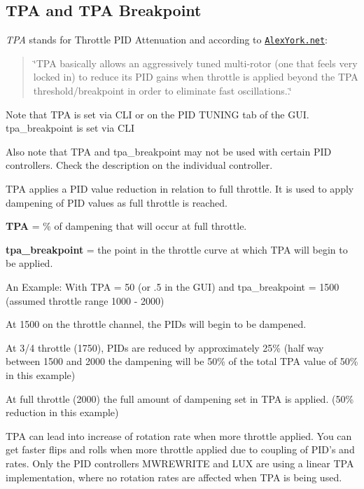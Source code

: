 \subsection*{T\+P\+A and T\+P\+A Breakpoint}

{\itshape T\+P\+A} stands for Throttle P\+I\+D Attenuation and according to \href{http://blog.alexyorke.net/what-is-tpa/}{\tt Alex\+York.\+net}\+:

\begin{quote}
\char`\"{}\+T\+P\+A basically allows an aggressively tuned multi-\/rotor (one that feels very locked in) to reduce its P\+I\+D gains when throttle is applied beyond the T\+P\+A threshold/breakpoint in order to eliminate fast oscillations..\char`\"{} \end{quote}


Note that T\+P\+A is set via C\+L\+I or on the P\+I\+D T\+U\+N\+I\+N\+G tab of the G\+U\+I. {\ttfamily tpa\+\_\+breakpoint} is set via C\+L\+I

Also note that T\+P\+A and {\ttfamily tpa\+\_\+breakpoint} may not be used with certain P\+I\+D controllers. Check the description on the individual controller.

T\+P\+A applies a P\+I\+D value reduction in relation to full throttle. It is used to apply dampening of P\+I\+D values as full throttle is reached.

{\bfseries T\+P\+A} = \% of dampening that will occur at full throttle.

{\bfseries tpa\+\_\+breakpoint} = the point in the throttle curve at which T\+P\+A will begin to be applied.

An Example\+: With T\+P\+A = 50 (or .5 in the G\+U\+I) and {\ttfamily tpa\+\_\+breakpoint} = 1500 (assumed throttle range 1000 -\/ 2000)


\begin{DoxyItemize}
\item At 1500 on the throttle channel, the P\+I\+Ds will begin to be dampened.
\item At 3/4 throttle (1750), P\+I\+Ds are reduced by approximately 25\% (half way between 1500 and 2000 the dampening will be 50\% of the total T\+P\+A value of 50\% in this example)
\item At full throttle (2000) the full amount of dampening set in T\+P\+A is applied. (50\% reduction in this example)
\item T\+P\+A can lead into increase of rotation rate when more throttle applied. You can get faster flips and rolls when more throttle applied due to coupling of P\+I\+D's and rates. Only the P\+I\+D controllers M\+W\+R\+E\+W\+R\+I\+T\+E and L\+U\+X are using a linear T\+P\+A implementation, where no rotation rates are affected when T\+P\+A is being used.
\end{DoxyItemize}




